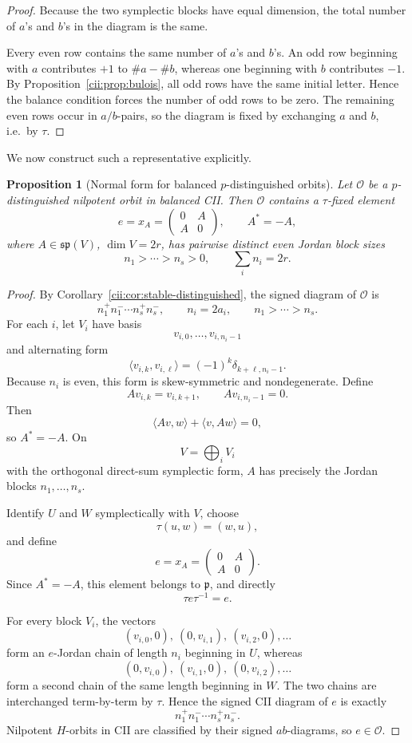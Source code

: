 \documentclass[10pt,a4paper]{amsart}
\numberwithin{equation}{section}
\newtheorem{proposition}[theorem]{Proposition}
\begin{document}
\begin{proof}
Because the two symplectic blocks have equal dimension, the total number
of \(a\)'s and \(b\)'s in the diagram is the same.

Every even row contains the same number of \(a\)'s and \(b\)'s.
An odd row beginning with \(a\) contributes \(+1\) to
\(\#a-\#b\), whereas one beginning with \(b\) contributes \(-1\).
By Proposition~\ref{cii:prop:bulois}, all odd rows have the same initial
letter.  Hence the balance condition forces the number of odd rows to be
zero.  The remaining even rows occur in \(a/b\)-pairs, so the diagram is
fixed by exchanging \(a\) and \(b\), i.e.\ by \(\tau\).
\end{proof}

We now construct such a representative explicitly.

\begin{proposition}[Normal form for balanced \(p\)-distinguished orbits]
\label{cii:prop:normal-form}
Let \(\mathcal O\) be a \(p\)-distinguished nilpotent orbit in balanced
CII.  Then \(\mathcal O\) contains a \(\tau\)-fixed element
\[
e=x_A=
\begin{pmatrix}
0&A\\
A&0
\end{pmatrix},
\qquad
A^*=-A,
\]
where \(A\in\mathfrak{sp}(V)\), \(\dim V=2r\), has pairwise distinct even
Jordan block sizes
\[
n_1>\cdots>n_s>0,
\qquad
\sum_i n_i=2r.
\]
\end{proposition}

\begin{proof}
By Corollary~\ref{cii:cor:stable-distinguished}, the signed diagram of
\(\mathcal O\) is
\[
n_1^+n_1^-\cdots n_s^+n_s^-,
\qquad
n_i=2a_i,
\qquad
n_1>\cdots>n_s.
\]
For each \(i\), let \(V_i\) have basis
\[
v_{i,0},\ldots,v_{i,n_i-1}
\]
and alternating form
\[
\langle v_{i,k},v_{i,\ell}\rangle
=
(-1)^k\delta_{k+\ell,n_i-1}.
\]
Because \(n_i\) is even, this form is skew-symmetric and nondegenerate.
Define
\[
Av_{i,k}=v_{i,k+1},
\qquad
Av_{i,n_i-1}=0.
\]
Then
\[
\langle Av,w\rangle+\langle v,Aw\rangle=0,
\]
so \(A^*=-A\).  On
\[
V=\bigoplus_iV_i
\]
with the orthogonal direct-sum symplectic form, \(A\) has precisely the
Jordan blocks \(n_1,\ldots,n_s\).

Identify \(U\) and \(W\) symplectically with \(V\), choose
\[
\tau(u,w)=(w,u),
\]
and define
\[
e=x_A=
\begin{pmatrix}
0&A\\
A&0
\end{pmatrix}.
\]
Since \(A^*=-A\), this element belongs to \(\mathfrak p\), and directly
\[
\tau e\tau^{-1}=e.
\]

For every block \(V_i\), the vectors
\[
(v_{i,0},0),\ (0,v_{i,1}),\ (v_{i,2},0),\ldots
\]
form an \(e\)-Jordan chain of length \(n_i\) beginning in \(U\), whereas
\[
(0,v_{i,0}),\ (v_{i,1},0),\ (0,v_{i,2}),\ldots
\]
form a second chain of the same length beginning in \(W\).  The two chains
are interchanged term-by-term by \(\tau\).  Hence the signed CII diagram
of \(e\) is exactly
\[
n_1^+n_1^-\cdots n_s^+n_s^-.
\]
Nilpotent \(H\)-orbits in CII are classified by their signed
\(ab\)-diagrams, so \(e\in\mathcal O\).
\end{proof}
\end{document}

